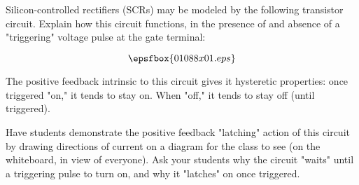 

Silicon-controlled rectifiers (SCRs) may be modeled by the following transistor circuit.  Explain how this circuit functions, in the presence of and absence of a "triggering" voltage pulse at the gate terminal:

$$\epsfbox{01088x01.eps}$$







The positive feedback intrinsic to this circuit gives it hysteretic properties: once triggered "on," it tends to stay on.  When "off," it tends to stay off (until triggered).







Have students demonstrate the positive feedback "latching" action of this circuit by drawing directions of current on a diagram for the class to see (on the whiteboard, in view of everyone).  Ask your students why the circuit "waits" until a triggering pulse to turn on, and why it "latches" on once triggered.




